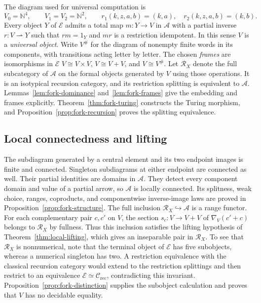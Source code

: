 \documentclass[11pt]{article}
\newcommand{\N}{\mathbb N}
\begin{document}
The diagram used for universal computation is
\begin{equation}\label{eq:universal-fork}
 V_0=\N^4,\qquad V_1=V_2=\N^2,\qquad
 r_1(k,z,a,b)=(k,a),\quad r_2(k,z,a,b)=(k,b).
\end{equation}
Every object $Y$ of $\mathcal E$ admits a total map $m:Y\to V$ in
$\mathcal A$ with a partial
inverse $r:V\rightharpoonup Y$ such that $rm=1_Y$ and
$mr$ is a restriction idempotent. In this sense $V$ is a
\emph{universal object}.
Write $V^\#$ for the diagram of nonempty finite words in its
components, with transitions acting letter by letter.
The chosen \emph{frames} are isomorphisms in $\mathcal E$
$V\cong V\times V$, $V\cong V+V$, and $V\cong V^\#$.
Let $\mathscr R_X$ denote the full subcategory of $\mathcal A$
on the formal objects generated by $V$ using those operations.
It is an isotypical recursion category, and its restriction
splitting is equivalent to $\mathcal A$.
Lemmas~\ref{lem:fork-dominance} and~\ref{lem:fork-frames} give the
embedding and frames explicitly. Theorem~\ref{thm:fork-turing}
constructs the Turing morphism, and
Proposition~\ref{prop:fork-recursion} proves the splitting equivalence.

\subsection{Local connectedness and lifting}

The subdiagram generated by a central element and its two endpoint
images is finite and connected. Singleton subdiagrams at either endpoint
are connected as well. Their partial identities are domains in
$\mathcal A$. They detect every
component domain and value of a partial arrow, so $\mathcal A$ is locally
connected. Its splitness, weak choice, ranges, coproducts, and
componentwise inverse-image laws are proved in
Proposition~\ref{prop:fork-structure}.
The full inclusion $\mathscr R_X\hookrightarrow\mathcal A$ is a
range functor.
For each complementary pair $c,c'$ on $V$, the section
$s_c:V\to V+V$ of $\nabla_V(c'+c)$ belongs to $\mathscr R_X$
by fullness. Thus this inclusion satisfies the lifting hypothesis of
Theorem~\ref{thm:local-lifting}, which gives an inseparable pair in
$\mathscr R_X$.
To see that $\mathscr R_X$ is nonnumerical, note that the terminal
object of $\mathcal E$ has five subobjects,
whereas a numerical singleton has two.
A restriction equivalence with the classical recursion category
would extend to the restriction splittings and then restrict to an
equivalence $\mathcal E\simeq\mathcal C_{\mathrm{rec}}$, contradicting
this invariant. Proposition~\ref{prop:fork-distinction} supplies the
subobject calculation and proves that $V$ has no decidable equality.
\end{document}
